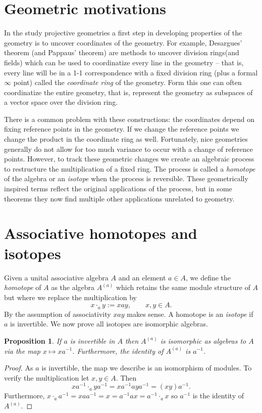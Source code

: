 \documentclass[12pt]{article}
\newtheorem{prop}[thm]{Proposition}
\begin{document}
\section{Geometric motivations}

In the study projective geometries a first step in developing 
properties of the geometry is to uncover coordinates of the geometry. For example, Desargues' theorem (and Pappaus' theorem) are methods to uncover division rings(and fields) which can be used to coordinatize every line in the geometry -- that is, every line will be in a 1-1 correspondence with a fixed
division ring (plus a formal $\infty$ point) called the \emph{coordinate ring} of the geometry.  Form this 
one can often coordinatize the entire geometry, that is, represent the
geometry as subspaces of a vector space over the division ring.  

There is a common problem with these constructions: the coordinates depend
on fixing reference points in the geometry.  If we change the reference
points we change the product in the coordinate ring as well.  Fortunately,
nice geometries generally do not allow for too much variance to occur with
a change of reference points.  However, to track these geometric changes we
create an algebraic process to restructure the multiplication of a fixed
ring.  The process is called a \emph{homotope} of the algebra or an \emph{isotope} when the process is reversible.  These geometrically inspired
terms reflect the original applications of the process, but in some theorems
they now find multiple other applications unrelated to geometry.

\section{Associative homotopes and isotopes}

Given a unital associative algebra $A$ and an element $a\in A$, we define the 
\emph{homotope} of $A$ as the algebra $A^{(a)}$ which retains the same module
structure of $A$ but where we replace the multiplication by
   \[x\cdot_{a} y:=xay,\qquad x,y\in A.\]
By the assumption of associativity $xay$ makes sense.  A homotope is an \emph{isotope} if $a$ is invertible.  We now prove all isotopes are isomorphic 
algebras.

\begin{prop}
If $a$ is invertible in $A$ then $A^{(a)}$ is isomorphic as algebras to $A$
via the map $x\mapsto xa^{-1}$.  Furthermore, the identity of $A^{(a)}$ is
$a^{-1}$.
\end{prop}
\begin{proof}
As $a$ is invertible, the map we describe is an isomorphism of modules.
To verify the multiplication let $x,y\in A$.  Then
\[xa^{-1}\cdot_a ya^{-1} = xa^{-1} aya^{-1}=(xy)a^{-1}.\]
Furthermore, $x\cdot_a a^{-1}=xaa^{-1}=x=a^{-1} ax=a^{-1}\cdot_a x$ so
$a^{-1}$ is the identity of $A^{(a)}$.
\end{proof}
\end{document}
